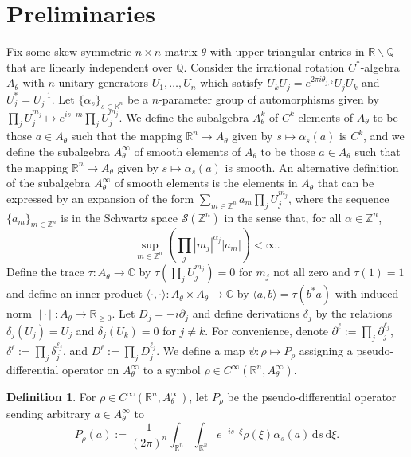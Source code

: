 \documentclass[10pt]{article}
\theoremstyle{remark}
\theoremstyle{definition}
\newtheorem{define}[thm]{Definition}
\begin{document}
\section{Preliminaries}
Fix some skew symmetric $n\times n$ matrix $\theta$ with upper
triangular entries in $\mathbb R\backslash\mathbb Q$ that are linearly
independent over $\mathbb Q$. Consider the irrational rotation
$C^*$-algebra $A_{\theta}$ with $n$ unitary generators $U_1,\ldots,U_n$ which
satisfy $U_kU_j=e^{2\pi i\theta_{j,k}}U_jU_k$ and $U_j^*=U_j^{-1}$. Let
$\{\alpha_s\}_{s\in\mathbb R^n}$ be a $n$-parameter group of automorphisms
given by $\prod_jU_j^{m_j}\mapsto e^{is\cdot m}\prod_jU_j^{m_j}$. We define
the subalgebra $A_{\theta}^k$ of $C^k$ elements of $A_{\theta}$ to be those
$a\in A_{\theta}$ such that the mapping $\mathbb R^n\rightarrow A_{\theta}$
given by $s\mapsto\alpha_s(a)$ is $C^k$, and we define the subalgebra
$A_{\theta}^{\infty}$ of smooth elements of $A_{\theta}$ to be those
$a\in A_{\theta}$ such that the mapping $\mathbb R^n\rightarrow A_{\theta}$
given by $s\mapsto\alpha_s(a)$ is smooth. An alternative definition of the
subalgebra $A_{\theta}^{\infty}$ of smooth elements is the elements in
$A_{\theta}$ that can be expressed by an expansion of the form
$\sum_{m\in\mathbb Z^n}a_m\prod_jU_j^{m_j}$, where the sequence
$\{a_m\}_{m\in\mathbb Z^n}$ is in the Schwartz space $\mathcal S(\mathbb Z^n)$
in the sense that, for all $\alpha\in\mathbb Z^n$,
$$\sup_{m\in\mathbb Z^n}(\prod_j|m_j|^{\alpha_j}|a_m|)<\infty.$$
Define the trace $\tau:A_{\theta}\rightarrow\mathbb C$ by
$\tau(\prod_jU_j^{m_j})=0$ for $m_j$ not all zero
and $\tau(1)=1$ and define an inner product
$\langle\cdot,\cdot\rangle:A_{\theta}\times A_{\theta}\rightarrow\mathbb C$
by $\langle a,b\rangle=\tau(b^*a)$ with induced norm
$||\cdot||:A_{\theta}\rightarrow\mathbb R_{\ge 0}$.
Let $D_j=-i\partial_j$ and
define derivations $\delta_j$ by the relations $\delta_j(U_j)=U_j$ and
$\delta_j(U_k)=0$ for $j\ne k$. For convenience, denote
$\partial^{\ell}:=\prod_j\partial_j^{\ell_j}$,
$\delta^{\ell}:=\prod_j\delta_j^{\ell_j}$, and
$D^{\ell}:=\prod_jD_j^{\ell_j}$.
We define a map $\psi:\rho\mapsto P_{\rho}$ assigning a pseudo-differential
operator on $A_{\theta}^{\infty}$ to a symbol
$\rho\in C^{\infty}(\mathbb R^n,A_{\theta}^{\infty})$.
\begin{define}
For $\rho\in C^{\infty}(\mathbb R^n,A_{\theta}^{\infty})$,
let $P_{\rho}$ be the pseudo-differential operator
sending arbitrary $a\in A_{\theta}^{\infty}$ to
$$P_{\rho}(a):=\frac{1}{(2\pi)^n}
\int_{\mathbb R^n}\!\int_{\mathbb R^n}\!
e^{-is\cdot\xi}\rho(\xi)\alpha_s(a)\,\mathrm ds\,\mathrm d\xi.$$
\end{define}
\end{document}
